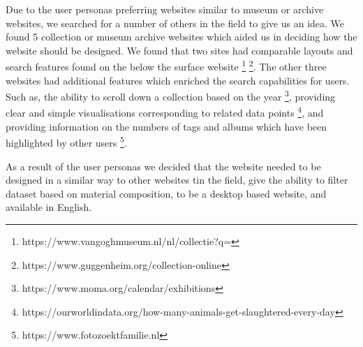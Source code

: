 Due to the user personas preferring websites similar to museum or archive websites, we searched for a number of others in the field to give us an idea.  We found 5 collection or museum archive websites which aided us in deciding how the website should be designed. We found that two sites had comparable layouts and search features found on the below the surface website \footnote{https://www.vangoghmuseum.nl/nl/collectie?q=} \footnote{https://www.guggenheim.org/collection-online}.  The other three websites had additional features which enriched the search capabilities for users. Such as, the ability to scroll down a collection based on the year \footnote{https://www.moma.org/calendar/exhibitions}, providing clear and simple visualisations corresponding to related data points \footnote{https://ourworldindata.org/how-many-animals-get-slaughtered-every-day}, and providing information on the numbers of tags and albums which have been highlighted by other users \footnote{https://www.fotozoektfamilie.nl}.  

As a result of the user personas we decided that the website needed to be designed in a similar way to other websites tin the field, give the ability to filter dataset based on material composition, to be a desktop based website, and available in English.